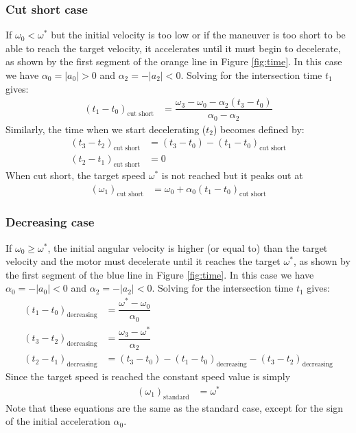 \documentclass[12pt, a4paper]
{article}
\providecommand{\lr}[1]{\left(#1\right)}
\providecommand{\sub}[1]{_{\text{#1}}}
\providecommand{\w}{\omega}
\providecommand{\wt}{\w^*}
\renewcommand{\a}{\alpha}
\providecommand{\abs}[1]{\left|#1\right|}
\begin{document}
\subsubsection{Cut short case}
\label{sec:t:cutshort}
If $\w_0 < \wt$ but the initial velocity is too low or if the
maneuver is too short to be able to reach the target velocity, it accelerates
until it must begin to decelerate, as shown by the first segment of the orange
line in Figure \ref{fig:time}.
In this case we have $\a_0 = \abs{a_0} > 0$ and $\a_2 = -\abs{a_2} < 0$.
Solving for the intersection time $t_1$ gives:
%
\begin{align}
    \label{eq:t:t1mt0:cutshort}
    \lr{t_1 - t_0}\sub{cut short} &=
        \dfrac{\w_3-\w_0 - \a_2(t_3-t_0)}{\a_0-\a_2}
\end{align}
%
Similarly, the time when we start decelerating ($t_2$) becomes defined by:
%
\begin{align}
    \label{eq:t:t3mt2:cutshort}
    \lr{t_3 - t_2}\sub{cut short} &= (t_3 - t_0) - (t_1 - t_0)\sub{cut short}
    \\[1em]
    \label{eq:t:t2mt1:cutshort}
    \lr{t_2 - t_1}\sub{cut short} &= 0
\end{align}
%
When cut short, the target speed $\wt$ is not reached but it peaks out at
%
\begin{align}
    \lr{\w_1}\sub{cut short} &= \w_0 + \a_0(t_1 - t_0)\sub{cut short}
\end{align}

\subsubsection{Decreasing case}
\label{sec:t:decreasing}
If $\w_0 \geq \wt$, the initial angular velocity is higher (or equal to) than
the target velocity and the motor must decelerate until it reaches the target
$\wt$, as shown by the first segment of the blue line in Figure \ref{fig:time}.
In this case we have $\a_0 = -\abs{a_0} < 0$ and $\a_2 = -\abs{a_2} < 0$.
Solving for the intersection time $t_1$ gives:
%
\begin{align}
    \label{eq:t:t1mt0:decreasing}
    \lr{t_1 - t_0}\sub{decreasing} &= \dfrac{\wt-\w_0}{\a_0}\\[1em]
    \label{eq:t:t3mt2:decreasing}
    \lr{t_3 - t_2}\sub{decreasing} &= \dfrac{\w_3-\wt}{\a_2}\\[1em]
    \label{eq:t:t2mt1:decreasing}
    \lr{t_2 - t_1}\sub{decreasing} &=
        (t_3 - t_0) - \lr{t_1 - t_0}\sub{decreasing} -
        \lr{t_3 - t_2}\sub{decreasing}
\end{align}
%
Since the target speed is reached the constant speed value is simply
\begin{align}
    \lr{\w_1}\sub{standard} &= \wt
\end{align}
%
Note that these equations are the same as the standard case, except for the
sign of the initial acceleration $\a_0$.
\end{document}
